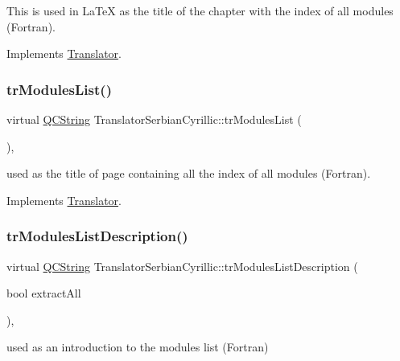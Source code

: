 This is used in La\+TeX as the title of the chapter with the index of all modules (Fortran). 

Implements \mbox{\hyperlink{class_translator}{Translator}}.

\mbox{\label{class_translator_serbian_cyrillic_ac6079b257d5edfd465c0ffe6264b7326}} 
\subsubsection{\texorpdfstring{trModulesList()}{trModulesList()}}
{\footnotesize\ttfamily virtual \mbox{\hyperlink{class_q_c_string}{Q\+C\+String}} Translator\+Serbian\+Cyrillic\+::tr\+Modules\+List (\begin{DoxyParamCaption}{ }\end{DoxyParamCaption})\hspace{0.3cm}{\ttfamily [inline]}, {\ttfamily [virtual]}}

used as the title of page containing all the index of all modules (Fortran). 

Implements \mbox{\hyperlink{class_translator}{Translator}}.

\mbox{\label{class_translator_serbian_cyrillic_abd9e64404e252a52136e6168d354db14}} 
\subsubsection{\texorpdfstring{trModulesListDescription()}{trModulesListDescription()}}
{\footnotesize\ttfamily virtual \mbox{\hyperlink{class_q_c_string}{Q\+C\+String}} Translator\+Serbian\+Cyrillic\+::tr\+Modules\+List\+Description (\begin{DoxyParamCaption}\item[{bool}]{extract\+All }\end{DoxyParamCaption})\hspace{0.3cm}{\ttfamily [inline]}, {\ttfamily [virtual]}}

used as an introduction to the modules list (Fortran) 

